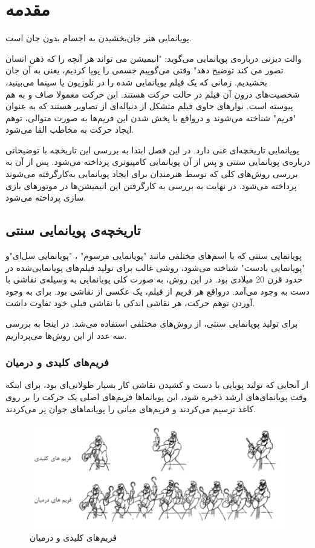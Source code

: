\chapter{مقدمه}
پویانمایی هنر جان‌بخشیدن به اجسام بدون جان است.

والت دیزنی درباره‌‌ی پویانمایی می‌گوید: "انیمیشن می تواند هر آنچه را که ذهن انسان تصور می کند توضیح دهد"
وقتی می‌گوییم جسمی را پویا کردیم، یعنی به آن جان بخشیدیم.
زمانی که یک فیلم پویانمایی شده را در تلوزیون یا سینما می‌بینید، شخصیت‌های درون آن فیلم در حالت حرکت هستند.
این حرکت معمولا صاف و به هم پیوسته است. نوارهای حاوی فیلم متشکل از دنباله‌ای از تصاویر هستند که به عنوان "فریم" شناخته می‌شوند و درواقع با پخش شدن این فریم‌ها
به صورت متوالی، توهم ایجاد حرکت به مخاطب القا می‌شود.

پویانمایی تاریخچه‌ای غنی‌ دارد. در این فصل ابتدا به بررسی این تاریخچه با توضیحاتی 
درباره‌ی پویانمایی سنتی و پس از آن پویانمایی کامپیوتری پرداخته می‌شود.
پس از آن به بررسی روش‌های کلی که توسط هنرمندان برای ایجاد پویانمایی به‌کارگرفته می‌شوند پرداخته می‌شود.
در نهایت به بررسی به کارگرفتن این انیمیشن‌ها در موتورهای بازی سازی پرداخته می‌شود.

\section{تاریخچه‌ی پویانمایی سنتی}

پویانمایی سنتی که با اسم‌های مختلفی مانند "پویانمایی مرسوم" ، "پویانمایی سل‌ای"و "پویانمایی بادست" شناخته می‌شود، روشی 
غالب برای تولید فیلم‌های پویانمایی‌شده در حدود قرن 20 میلادی بود.
در این روش، به صورت کلی پویانمایی به وسیله‌ی نقاشی با دست به وجود می‌‌آمد.
درواقع هر فریم از فیلم، یک عکسی از نقاشی بود.
برای به وجود آوردن توهم حرکت، هر نقاشی اندکی با نقاشی قبلی خود تفاوت داشت.

برای تولید پویانمایی سنتی، از روش‌های مختلفی استفاده می‌شد. در اینجا به بررسی
سه عدد از این روش‌ها می‌پردازیم.

\subsection{فریم‌های کلیدی و درمیان}
از آنجایی که تولید پویایی با دست و کشیدن نقاشی کار بسیار طولانی‌ای بود، برای اینکه وقت پویانمای‌های ارشد 
ذخیره شود، این پویانماها فریم‌های اصلی یک حرکت را بر روی کاغذ ترسیم می‌کردند و 
فریم‌های میانی را پویانماهای جوان پر می‌کردند.

\begin{figure}[ht]
	\centerline{\includegraphics[width=\textwidth,height=\textheight,keepaspectratio]{Figures/Ch1/KeyframeAnimation.png}}

	\caption{فریم‌های کلیدی و درمیان}
	\label{fig:KeyframeAnimation}
\end{figure}

